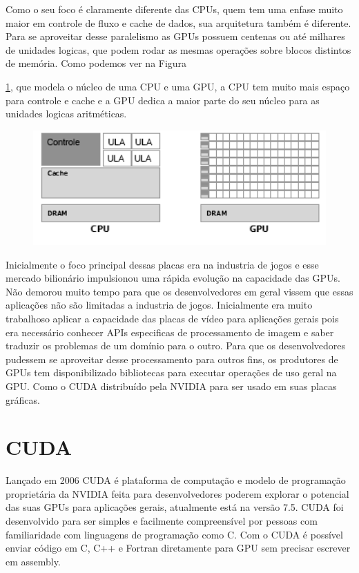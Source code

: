 Como o seu foco é claramente diferente das CPUs, quem tem uma enfase muito maior em controle de fluxo e cache de dados, sua arquitetura também é diferente. Para se aproveitar desse paralelismo as GPUs possuem centenas ou até milhares de unidades logicas, que podem rodar as mesmas operações sobre blocos distintos de memória. Como podemos ver na Figura

\ref{fig:gpu_1}, que modela o núcleo de uma CPU e uma GPU, a CPU tem muito mais espaço para controle e cache e a GPU dedica a maior parte do seu núcleo para as unidades logicas aritméticas.

\begin{figure}
  \centering
  \includegraphics[width=1\textwidth]{imagens/gpu_1.png}
  \label{fig:gpu_1}
\end{figure}

Inicialmente o foco principal dessas placas era na industria de jogos e esse mercado bilionário impulsionou uma rápida evolução na capacidade das GPUs. Não demorou muito tempo para que os desenvolvedores em geral vissem que essas aplicações não são limitadas a industria de jogos. Inicialmente era muito trabalhoso aplicar a capacidade das placas de vídeo para aplicações gerais pois era necessário conhecer APIs especificas de processamento de imagem e saber traduzir os problemas de um domínio para o outro. Para que os desenvolvedores pudessem se aproveitar desse processamento para outros fins, os produtores de GPUs tem disponibilizado bibliotecas para executar operações de uso geral na GPU. Como o CUDA distribuído pela NVIDIA para ser usado em suas placas gráficas.

\section{CUDA}
Lançado em 2006 CUDA é plataforma de computação e modelo de programação proprietária da NVIDIA feita para desenvolvedores poderem explorar o potencial das suas GPUs para aplicações gerais, atualmente está na versão 7.5. CUDA foi desenvolvido para ser simples e facilmente compreensível por pessoas com familiaridade com linguagens de programação como C. Com o CUDA é possível enviar código em C, C++ e Fortran diretamente para GPU sem precisar escrever em assembly. 


